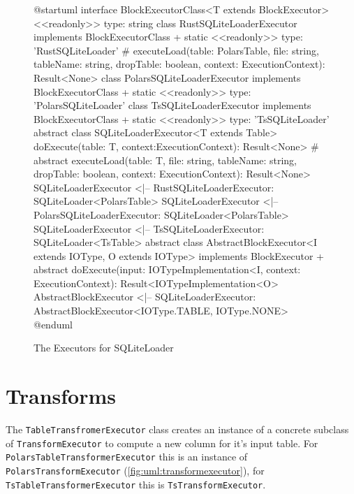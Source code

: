 \begin{figure}
	\begin{plantuml}
		@startuml
		interface BlockExecutorClass<T extends BlockExecutor> {
				<<readonly>> type: string
			}
		class RustSQLiteLoaderExecutor implements BlockExecutorClass {
		+ {static} <<readonly>> type: 'RustSQLiteLoader'
		# executeLoad(table: PolarsTable, file: string, tableName: string, dropTable: boolean, context: ExecutionContext): Result<None>
		}
		class PolarsSQLiteLoaderExecutor implements BlockExecutorClass {
		+ {static} <<readonly>> type: 'PolarsSQLiteLoader'
		}
		class TsSQLiteLoaderExecutor implements BlockExecutorClass {
		+ {static} <<readonly>> type: 'TsSQLiteLoader'
		}
		abstract class SQLiteLoaderExecutor<T extends Table> {
		doExecute(table: T, context:ExecutionContext): Result<None>
		# {abstract} executeLoad(table: T, file: string, tableName: string, dropTable: boolean, context: ExecutionContext): Result<None>
		}
		SQLiteLoaderExecutor <|-- RustSQLiteLoaderExecutor: SQLiteLoader<PolarsTable>
		SQLiteLoaderExecutor <|-- PolarsSQLiteLoaderExecutor: SQLiteLoader<PolarsTable>
		SQLiteLoaderExecutor <|-- TsSQLiteLoaderExecutor: SQLiteLoader<TsTable>
		abstract class AbstractBlockExecutor<I extends IOType, O extends IOType> implements BlockExecutor {
		+ {abstract} doExecute(input: IOTypeImplementation<I\>, context: ExecutionContext): Result<IOTypeImplementation<O>\>
		}
		AbstractBlockExecutor <|-- SQLiteLoaderExecutor: AbstractBlockExecutor<IOType.TABLE, IOType.NONE>
		@enduml
	\end{plantuml}
	\caption{The Executors for SQLiteLoader}
	\label{fig:uml:sqliteloaderexecutor:combined}
\end{figure}


\section{Transforms}
\label{section:transforms}
The \Verb|TableTransfromerExecutor| class creates an instance of a concrete subclass of \Verb|TransformExecutor| to compute a new column for it's input table.
For \Verb|PolarsTableTransformerExecutor| this is an instance of  \Verb|PolarsTransformExecutor| (\ref{fig:uml:transformexecutor}), for \Verb|TsTableTransformerExecutor| this is \Verb|TsTransformExecutor|.

